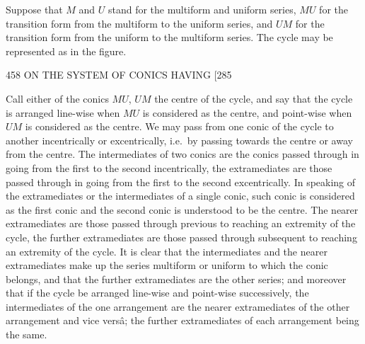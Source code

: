 \documentclass[11pt]{article}
\begin{document}
Suppose that $M$ and $U$ stand for the multiform and uniform series, $MU$ for the
transition form from the multiform to the uniform series, and $UM$ for the transition
form from the uniform to the multiform series. The cycle may be represented as in
the figure.

\medskip
\begin{center}
\end{center}
\medskip

\begin{center}
458 \hfill ON THE SYSTEM OF CONICS HAVING \hfill \textsc{[285}
\end{center}

Call either of the conics $MU$, $UM$ the centre of the cycle, and say that the
cycle is arranged line-wise when $MU$ is considered as the centre, and point-wise when
$UM$ is considered as the centre. We may pass from one conic of the cycle to another
incentrically or excentrically, i.e.\ by passing towards the centre or away from the
centre. The intermediates of two conics are the conics passed through in going from
the first to the second incentrically, the extramediates are those passed through in
going from the first to the second excentrically. In speaking of the extramediates or
the intermediates of a single conic, such conic is considered as the first conic and
the second conic is understood to be the centre. The nearer extramediates are those
passed through previous to reaching an extremity of the cycle, the further extramediates
are those passed through subsequent to reaching an extremity of the cycle. It is clear
that the intermediates and the nearer extramediates make up the series multiform or
uniform to which the conic belongs, and that the further extramediates are the other
series; and moreover that if the cycle be arranged line-wise and point-wise successively,
the intermediates of the one arrangement are the nearer extramediates of the other
arrangement and vice vers\^a; the further extramediates of each arrangement being the
same.
\end{document}
